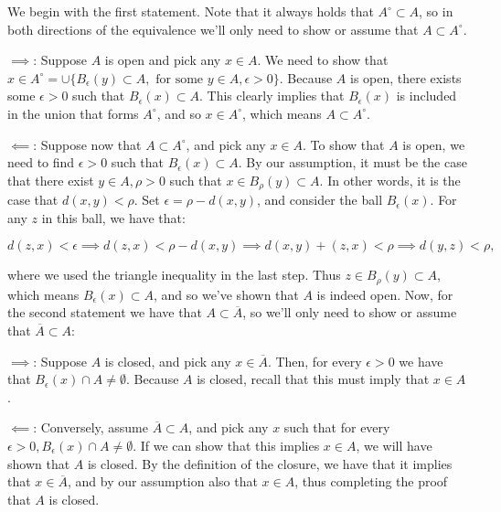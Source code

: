 \begin{solution}
    
    We begin with the first statement.
    Note that it always holds that $A^{\circ} \subset A$, so in both directions of the equivalence we'll only need to show or assume that $A \subset A^{\circ}$.
    
    $\implies$: Suppose $A$ is open and pick any $x \in A$.
    We need to show that $x \in A^{\circ} = \cup \{B_{\epsilon}(y) \subset A, \text{ for some } y \in A, \epsilon > 0\}$.
    Because $A$ is open, there exists some $\epsilon > 0$ such that $B_{\epsilon}(x) \subset A$.
    This clearly implies that $B_{\epsilon}(x)$ is included in the union that forms $A^{\circ}$, and so $x \in A^{\circ}$, which means $A \subset A^{\circ}$.

    $\impliedby$: Suppose now that $A \subset A^{\circ}$, and pick any $x \in A$.
    To show that $A$ is open, we need to find $\epsilon > 0$ such that $B_{\epsilon}(x) \subset A$.
    By our assumption, it must be the case that there exist $y \in A, \rho > 0$ such that $x \in B_{\rho}(y) \subset A$.
    In other words, it is the case that $d(x, y) < \rho$.
    Set $\epsilon = \rho - d(x, y)$, and consider the ball $B_{\epsilon}(x)$.
    For any $z$ in this ball, we have that:

    $$d(z, x) < \epsilon \implies d(z, x) < \rho - d(x, y) \implies d(x, y) + (z, x) < \rho \implies d(y, z) < \rho,$$

    where we used the triangle inequality in the last step.
    Thus $z \in B_{\rho}(y) \subset A$, which means $B_{\epsilon}(x) \subset A$, and so we've shown that $A$ is indeed open.
    Now, for the second statement we have that $A \subset \overline{A}$, so we'll only need to show or assume that $\overline{A} \subset A$:

    $\implies$: Suppose $A$ is closed, and pick any $x \in \overline{A}$.
    Then, for every $\epsilon > 0$ we have that $B_{\epsilon}(x) \cap A \neq \emptyset$.
    Because $A$ is closed, recall that this must imply that $x \in A$.

    $\impliedby$: Conversely, assume $\overline{A} \subset A$, and pick any $x$ such that for every $\epsilon > 0, B_{\epsilon}(x) \cap A \neq \emptyset$.
    If we can show that this implies $x \in A$, we will have shown that $A$ is closed.
    By the definition of the closure, we have that it implies that $x \in \overline{A}$, and by our assumption also that $x \in A$, thus completing the proof that $A$ is closed.

\end{solution}

